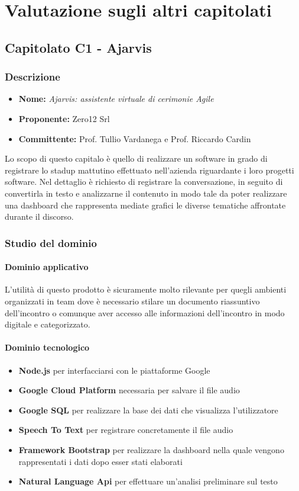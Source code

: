 \section{Valutazione sugli altri capitolati}
	\subsection{Capitolato C1 - Ajarvis}
		\subsubsection{Descrizione}
		\begin{itemize}
			\item \textbf{Nome:} \emph{Ajarvis: assistente virtuale di cerimonie Agile}
			\item \textbf{Proponente:} Zero12 Srl
			\item \textbf{Committente:} Prof. Tullio Vardanega e Prof. Riccardo Cardin
		\end{itemize}
	    Lo scopo di questo capitalo è quello di realizzare un software in grado di registrare lo stadup mattutino effettuato nell'azienda riguardante i loro progetti software. Nel dettaglio è richiesto di registrare la conversazione, in seguito di convertirla in testo e analizzarne il contenuto in modo tale da poter realizzare una dashboard che rappresenta mediate grafici le diverse tematiche affrontate durante il discorso.  
		\subsubsection{Studio del dominio}
			\paragraph{Dominio applicativo} \Spazio
			 L'utilità di questo prodotto è sicuramente molto rilevante per quegli ambienti organizzati in team dove è necessario stilare un documento riassuntivo dell'incontro o comunque aver accesso alle informazioni dell'incontro in modo digitale e categorizzato.
			\paragraph{Dominio tecnologico}
			\begin{itemize}
				\item \textbf{Node.js} per interfacciarsi con le piattaforme Google
				\item  \textbf{Google Cloud Platform} necessaria per salvare il file audio 
				\item  \textbf{Google SQL} per realizzare la base dei dati che visualizza l'utilizzatore
				\item  \textbf{Speech To Text} per registrare concretamente il file audio
				\item  \textbf{Framework Bootstrap} per realizzare la dashboard nella quale vengono rappresentati i dati dopo esser stati elaborati
				\item  \textbf{Natural Language Api} per effettuare un'analisi preliminare sul testo	
			\end{itemize}
			
